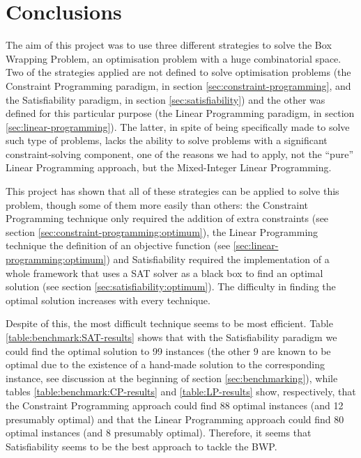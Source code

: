 \section{Conclusions}
\label{sec:conclusions}

The aim of this project was to use three different strategies to solve the Box Wrapping
Problem, an optimisation problem with a huge combinatorial space. Two of the
strategies applied are not defined to solve optimisation problems (the Constraint
Programming paradigm, in section \ref{sec:constraint-programming}, and the
Satisfiability paradigm, in section \ref{sec:satisfiability}) and the other
was defined for this particular purpose (the Linear Programming paradigm, in
section \ref{sec:linear-programming}). The latter, in spite of being specifically
made to solve such type of problems, lacks the ability to solve problems with
a significant constraint-solving component, one of the reasons we had to apply,
not the ``pure'' Linear Programming approach, but the Mixed-Integer Linear Programming.

\hfill

This project has shown that all of these strategies can be applied to solve this problem,
though some of them more easily than others: the Constraint Programming technique only
required the addition of extra constraints (see section \ref{sec:constraint-programming:optimum}),
the Linear Programming technique the definition of an objective function (see
\ref{sec:linear-programming:optimum}) and Satisfiability required the implementation of a
whole framework that uses a SAT solver as a black box to find an optimal solution (see section
\ref{sec:satisfiability:optimum}). The difficulty in finding the optimal solution increases
with every technique.

\hfill

Despite of this, the most difficult technique seems to be most efficient.
Table \ref{table:benchmark:SAT-results} shows that with the Satisfiability
paradigm we could find the optimal solution to 99 instances (the other 9 are known
to be optimal due to the existence of a hand-made solution to the corresponding
instance, see discussion at the beginning of section \ref{sec:benchmarking}), while tables
\ref{table:benchmark:CP-results} and \ref{table:LP-results} show, respectively, that
the Constraint Programming approach could find 88 optimal instances (and 12 presumably
optimal) and that the Linear Programming approach could find 80 optimal instances (and
8 presumably optimal). Therefore, it seems that Satisfiability seems to be the best
approach to tackle the BWP.

